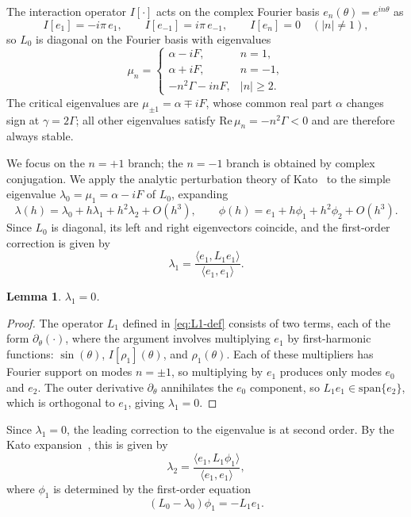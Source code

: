 \documentclass[a4paper,11pt]{article}
\theoremstyle{plain}
\newtheorem{lem}[thm]{Lemma}
\theoremstyle{definition}
\theoremstyle{remark}
\begin{document}
The interaction operator $I[\cdot]$ acts on the complex Fourier basis $e_n(\theta) = e^{in\theta}$ as
\begin{equation*}\label{eq:I-on-en}
    I[e_1] = -i\pi\, e_1, \qquad
    I[e_{-1}] = i\pi\, e_{-1}, \qquad
    I[e_n] = 0 \quad (|n| \neq 1),
\end{equation*}
so $L_0$ is diagonal on the Fourier basis with eigenvalues
\begin{equation*}\label{eq:L0-spectrum}
    \mu_n = \begin{cases}
        \alpha - iF, & n = 1, \\
        \alpha + iF, & n = -1, \\
        -n^2\Gamma - inF, & |n| \geq 2.
    \end{cases}
\end{equation*}
The critical eigenvalues are $\mu_{\pm 1} = \alpha \mp iF$, whose common real part $\alpha$ changes sign at $\gamma = 2\Gamma$; all other eigenvalues satisfy $\mathrm{Re}\,\mu_n = -n^2\Gamma < 0$ and are therefore always stable.

We focus on the $n = +1$ branch; the $n = -1$ branch is obtained by complex conjugation. We apply the analytic perturbation theory of Kato~\cite{kato1966perturbation} to the simple eigenvalue $\lambda_0 = \mu_1 = \alpha - iF$ of $L_0$, expanding
\[
    \lambda(h) = \lambda_0 + h\lambda_1 + h^2\lambda_2 + O(h^3), \qquad
    \phi(h) = e_1 + h\phi_1 + h^2\phi_2 + O(h^3).
\]
Since $L_0$ is diagonal, its left and right eigenvectors coincide, and the first-order correction is given by
\[
    \lambda_1 = \frac{\langle e_1, L_1 e_1 \rangle}{\langle e_1, e_1 \rangle}.
\]

\begin{lem}\label{lem:lambda1-vanishes}
    $\lambda_1 = 0$.
\end{lem}

\begin{proof}
The operator $L_1$ defined in \eqref{eq:L1-def} consists of two terms, each of the form $\partial_\theta(\cdot)$, where the argument involves multiplying $e_1$ by first-harmonic functions: $\sin(\theta)$, $I[\rho_1](\theta)$, and $\rho_1(\theta)$. Each of these multipliers has Fourier support on modes $n = \pm 1$, so multiplying by $e_1$ produces only modes $e_0$ and $e_2$. The outer derivative $\partial_\theta$ annihilates the $e_0$ component, so $L_1 e_1 \in \mathrm{span}\{e_2\}$, which is orthogonal to $e_1$, giving $\lambda_1 = 0$.
\end{proof}
Since $\lambda_1 = 0$, the leading correction to the eigenvalue is at second order. By the Kato expansion~\cite{kato1966perturbation}, this is given by
\begin{equation}\label{eq:lambda2-general}
    \lambda_2 = \frac{\langle e_1, L_1\phi_1\rangle}{\langle e_1, e_1\rangle},
\end{equation}
where $\phi_1$ is determined by the first-order equation
\[
    (L_0 - \lambda_0)\phi_1 = -L_1 e_1.
\]
\end{document}
